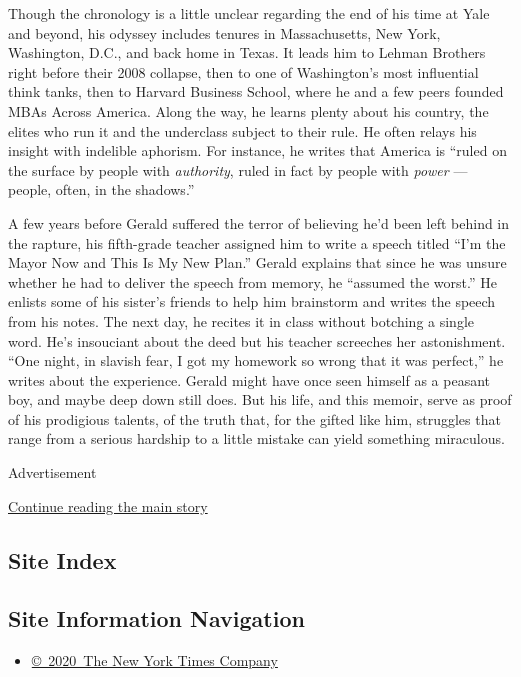 Though the chronology is a little unclear regarding the end of his time
at Yale and beyond, his odyssey includes tenures in Massachusetts, New
York, Washington, D.C., and back home in Texas. It leads him to Lehman
Brothers right before their 2008 collapse, then to one of Washington's
most influential think tanks, then to Harvard Business School, where he
and a few peers founded MBAs Across America. Along the way, he learns
plenty about his country, the elites who run it and the underclass
subject to their rule. He often relays his insight with indelible
aphorism. For instance, he writes that America is ``ruled on the surface
by people with \emph{authority}, ruled in fact by people with
\emph{power} --- people, often, in the shadows.''

A few years before Gerald suffered the terror of believing he'd been
left behind in the rapture, his fifth-grade teacher assigned him to
write a speech titled ``I'm the Mayor Now and This Is My New Plan.''
Gerald explains that since he was unsure whether he had to deliver the
speech from memory, he ``assumed the worst.'' He enlists some of his
sister's friends to help him brainstorm and writes the speech from his
notes. The next day, he recites it in class without botching a single
word. He's insouciant about the deed but his teacher screeches her
astonishment. ``One night, in slavish fear, I got my homework so wrong
that it was perfect,'' he writes about the experience. Gerald might have
once seen himself as a peasant boy, and maybe deep down still does. But
his life, and this memoir, serve as proof of his prodigious talents, of
the truth that, for the gifted like him, struggles that range from a
serious hardship to a little mistake can yield something miraculous.

Advertisement

\protect\hyperlink{after-bottom}{Continue reading the main story}

\hypertarget{site-index}{%
\subsection{Site Index}\label{site-index}}

\hypertarget{site-information-navigation}{%
\subsection{Site Information
Navigation}\label{site-information-navigation}}

\begin{itemize}
\tightlist
\item
  \href{https://help.nytimes3xbfgragh.onion/hc/en-us/articles/115014792127-Copyright-notice}{©~2020~The
  New York Times Company}
\end{itemize}

